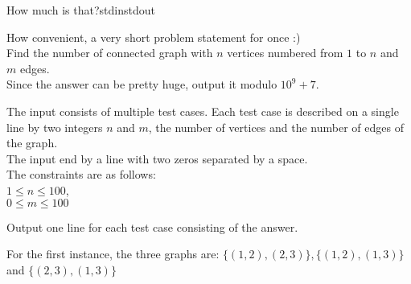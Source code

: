 \begin{problem}{How much is that?}{stdin}{stdout}{}


How convenient, a very short problem statement for once :)\\ 
Find the number of connected graph with $n$ vertices numbered from $1$ to $n$ and $m$ edges.\\
Since the answer can be pretty huge, output it modulo $10^9+7$.

\InputFile

The input consists of multiple test cases.
Each test case is described on a single line by two integers $n$ and $m$, the number of vertices and the number of edges of the graph.\\
The input end by a line with two zeros separated by a space.\\ 

The constraints are as follows:\\ 
$1\le n \le 100$,\\ 
$0\le m \le 100$ 

\OutputFile

Output one line for each test case consisting of the answer.

\Example

\begin{examplewide}
%
\end{examplewide}

For the first instance, the three graphs are:
$\{(1,2),(2,3)\}, \{(1,2),(1,3)\}$ and $\{(2,3),(1,3)\}$

\end{problem}

